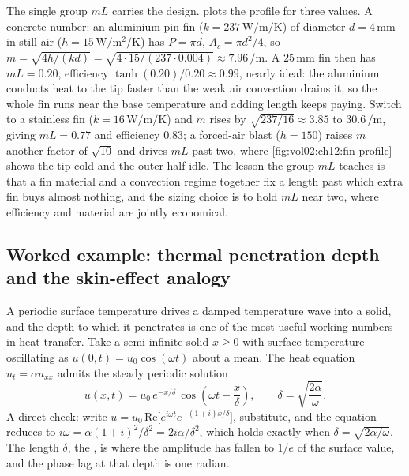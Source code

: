 The single group $mL$ carries the design. 
plots the profile for three values. A concrete number: an aluminium
pin fin ($k = 237\,\si{\watt\per\meter\per\kelvin}$) of diameter
$d = 4\,\si{\milli\meter}$ in still air ($h = 15\,\si{\watt\per\meter
\squared\per\kelvin}$) has $P = \pi d$, $A_{c} = \pi d^{2}/4$, so
$m = \sqrt{4h/(k d)} = \sqrt{4\cdot 15/(237\cdot 0.004)} \approx
7.96\,\si{\per\meter}$. A $25\,\si{\milli\meter}$ fin then has
$mL = 0.20$, efficiency $\tanh(0.20)/0.20 \approx 0.99$, nearly
ideal: the aluminium conducts heat to the tip faster than the weak
air convection drains it, so the whole fin runs near the base
temperature and adding length keeps paying. Switch to a stainless
fin ($k = 16\,\si{\watt\per\meter\per\kelvin}$) and $m$ rises by
$\sqrt{237/16} \approx 3.85$ to $30.6\,\si{\per\meter}$, giving
$mL = 0.77$ and efficiency $0.83$; a forced-air blast ($h =
150$) raises $m$ another factor of $\sqrt{10}$ and drives $mL$ past
two, where \cref{fig:vol02:ch12:fin-profile} shows the tip cold and
the outer half idle. The lesson the group $mL$ teaches is that a fin
material and a convection regime together fix a length past which
extra fin buys almost nothing, and the sizing choice is to hold
$mL$ near two, where efficiency and material are jointly economical.



\subsection{Worked example: thermal penetration depth and the skin-effect analogy}

A periodic surface temperature drives a damped temperature wave
into a solid, and the depth to which it penetrates is one of the
most useful working numbers in heat transfer. Take a semi-infinite
solid $x \geq 0$ with surface temperature oscillating as
$u(0, t) = u_{0} \cos(\omega t)$ about a mean. The heat equation
$u_{t} = \alpha u_{xx}$ admits the steady periodic solution
\[
u(x, t) = u_{0}\, e^{-x/\delta}\, \cos\!\left(\omega t - \frac{x}{\delta}\right), \qquad \delta = \sqrt{\frac{2 \alpha}{\omega}}.
\]
A direct check: write $u = u_{0}\,\mathrm{Re}\bigl[e^{i\omega t}
e^{-(1 + i) x/\delta}\bigr]$, substitute, and the equation reduces
to $i\omega = \alpha (1 + i)^{2}/\delta^{2} = 2 i \alpha/\delta^{2}$,
which holds exactly when $\delta = \sqrt{2\alpha/\omega}$. The
length $\delta$, the , is where
the amplitude has fallen to $1/e$ of the surface value, and the
phase lag at that depth is one radian.

